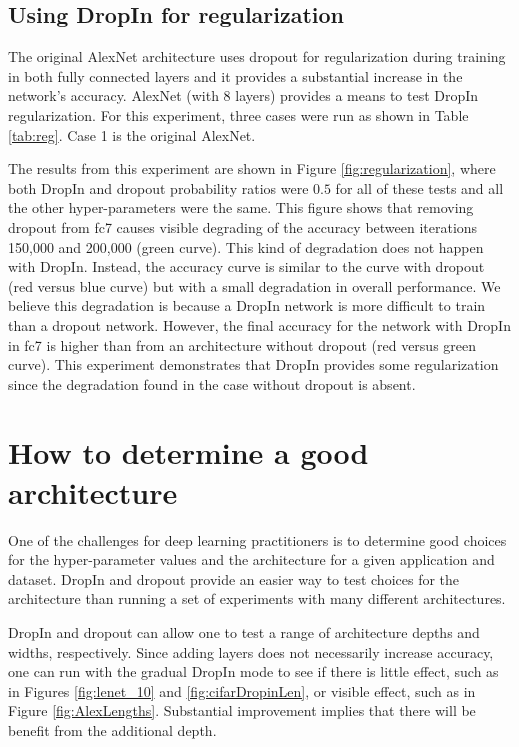 \documentclass[10pt,twocolumn,letterpaper]{article}
\newcommand{\dropin}{DropIn }
\newcommand{\dropinNS}{DropIn}
\begin{document}
\subsection{Using \dropin for regularization}
\label{sec:regularization}
The original AlexNet architecture uses dropout for regularization during training in both fully connected layers and it provides a substantial increase in the network's accuracy.
AlexNet (with 8 layers) provides a means to test \dropin regularization.
For this experiment, three cases were run as shown in  Table \ref{tab:reg}.
Case 1 is the original AlexNet.




The results from this experiment are shown in Figure \ref{fig:regularization},
where both \dropin and dropout probability ratios were $ 0.5 $ for all of these tests and all the other hyper-parameters were the same.
This figure shows that removing dropout from fc7 causes visible degrading of the accuracy between iterations 150,000 and 200,000 (green curve).
This kind of degradation does not happen with \dropinNS.
Instead, the accuracy curve is similar to the curve with dropout (red versus blue curve) but with a small degradation in overall performance.
We believe this degradation is because a \dropin network is more difficult to train than a dropout network.
However, the final accuracy for the network with \dropin in fc7 is higher than from an architecture without dropout (red versus green curve).
This experiment  demonstrates that \dropin provides some regularization since the degradation found in the case without dropout is absent.




\section{How to determine a good architecture}

One of the challenges for deep learning practitioners is to determine good choices for the hyper-parameter values and the architecture for a given application and dataset.
\dropin and dropout provide an easier way to test choices for the architecture than running a set of experiments with many different architectures.

\dropin and dropout can allow one to test a range of architecture depths and widths, respectively.
Since adding layers does not necessarily increase accuracy, one can run with the gradual \dropin mode to see if there is little effect, such as in Figures \ref{fig:lenet_10} and  \ref{fig:cifarDropinLen}, or visible effect, such as in Figure \ref{fig:AlexLengths}.
Substantial improvement implies that there will be benefit from the additional depth.
\end{document}
